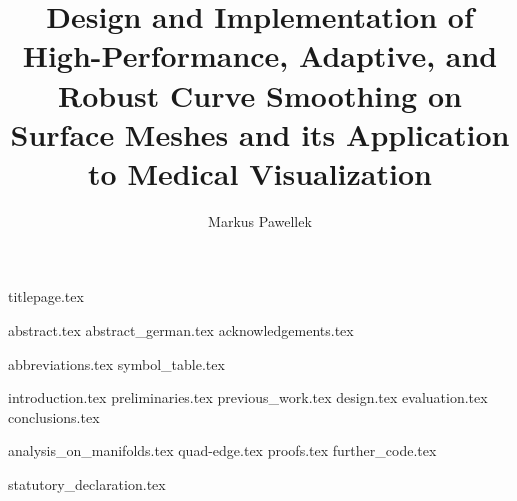 \documentclass[fleqn,10pt,twoside]{stdglobal}
\title{Design and Implementation of High-Performance, Adaptive, and Robust Curve Smoothing on Surface Meshes and its Application to Medical Visualization}
\author{Markus Pawellek}
\let\oldpagenumbering\pagenumbering
\renewcommand*\pagenumbering[1]{\cleardoublepage\oldpagenumbering{#1}}
\numberwithin{figure}{section}
\numberwithin{table}{section}
\begin{document}

  {titlepage.tex}

  {abstract.tex}
  \cleardoublepage
  {abstract_german.tex}
  {acknowledgements.tex}

  \tableofcontents
  \listoffigures
  \listoftables
  \listofmath
  {
    \small
    \listofcode
  }
  {abbreviations.tex}
  {symbol_table.tex}

  {introduction.tex}
  {preliminaries.tex}
  {previous_work.tex}
  {design.tex}
  {evaluation.tex}
  {conclusions.tex}

  \nocite{*}
  \printbibliography[heading=bibintoc]

  \appendix
  {analysis_on_manifolds.tex}
  {quad-edge.tex}
  {proofs.tex}
  {further_code.tex}

  {statutory_declaration.tex}
\end{document}
